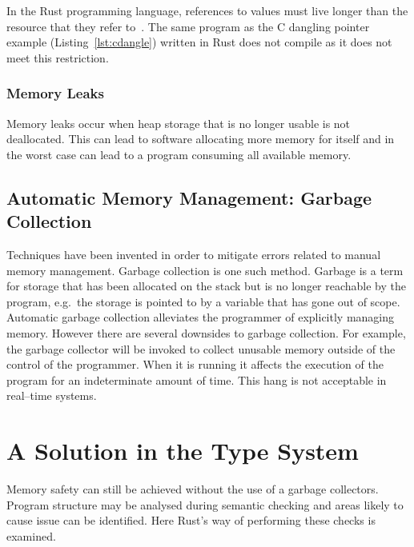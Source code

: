 

In the Rust programming language, references to values must live longer than
the resource that they refer to~\cite{rust-borrowing}. The same program as the 
C dangling pointer example (Listing~\ref{lst:cdangle}) written in Rust does not
compile as it does not meet this restriction.



\subsubsection{Memory Leaks}\label{sec:leak}
Memory leaks occur when heap storage that is no longer usable is not
deallocated. This can lead to software allocating more memory for itself and in
the worst case can lead to a program consuming all available memory.



\subsection{Automatic Memory Management: Garbage Collection}
Techniques have been invented in order to mitigate errors related to manual
memory management. Garbage collection is one such method.  Garbage is a term
for storage that has been allocated on the stack but is no longer reachable by
the program, e.g.\ the storage is pointed to by a variable that has gone out of
scope. Automatic garbage collection alleviates the programmer of explicitly
managing memory. However there are several downsides to garbage collection. For
example, the garbage collector will be invoked to collect unusable memory
outside of the control of the programmer. When it is running it affects the
execution of the program for an indeterminate amount of time. This hang is not
acceptable in real--time systems.

\section{A Solution in the Type System}
Memory safety can still be achieved without the use of a garbage collectors.
Program structure may be analysed during semantic checking and areas likely to
cause issue can be identified. Here Rust's way of performing these checks is
examined.

